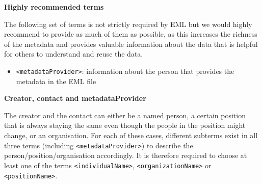 \documentclass[
  oneside]{book}
\providecommand{\tightlist}{%
  \setlength{\itemsep}{0pt}\setlength{\parskip}{0pt}}
\begin{document}
{\textbf{Highly recommended terms}}

The following set of terms is not strictly required by EML but we would highly recommend to provide as much of them as possible, as this increases the richness of the metadata and provides valuable information about the data that is helpful for others to understand and reuse the data.

\begin{itemize}
\tightlist
\item
  {\texttt{\textless{}metadataProvider\textgreater{}}}: information about the person that provides the metadata in the EML file
\end{itemize}

\textbf{Creator, contact and metadataProvider}

The creator and the contact can either be a named person, a certain position that is always staying the same even though the people in the position might change, or an organisation. For each of these cases, different subterms exist in all three terms (including \texttt{\textless{}metadataProvider\textgreater{}}) to describe the person/position/organisation accordingly. It is therefore required to choose at least one of the terms \texttt{\textless{}individualName\textgreater{}}, \texttt{\textless{}organizationName\textgreater{}} or \texttt{\textless{}positionName\textgreater{}}.
\end{document}

